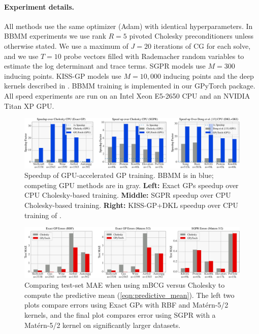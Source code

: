 \paragraph{Experiment details.} All methods use the same optimizer (Adam) with identical hyperparameters.
In BBMM experiments we use rank $R\!=\!5$ pivoted Cholesky preconditioners unless otherwise stated.
We use a maximum of $J\!=\!20$ iterations of CG for each solve, and
we use $T\!=\!10$ probe vectors filled with Rademacher random variables to estimate the log determinant and trace terms.
SGPR models use $M\!=\!300$ inducing points.
KISS-GP models use $M\!=\!10,\!000$ inducing points and the deep kernels described in \cite{wilson2016deep}.
BBMM training is implemented in our GPyTorch package.
All speed experiments are run on an Intel Xeon E5-2650 CPU and an NVIDIA Titan XP GPU.

\begin{figure}[t]
  \centering
  \includegraphics[width=\textwidth]{figures/sparse_gp_results}
  \caption[Speedup of GPU-accelerated GP training.]{
    Speedup of GPU-accelerated GP training.
    BBMM is in blue; competing GPU methods are in gray.
    {\bf Left:} Exact GPs speedup over CPU Cholesky-based training.
    {\bf Middle:} SGPR \cite{titsias2009variational,hensman2013gaussian} speedup over CPU Cholesky-based training.
    {\bf Right:} KISS-GP+DKL \cite{wilson2015kernel,wilson2016deep} speedup over CPU training of \citet{dong2017scalable}.
    \label{fig:timing_results}
  }
\end{figure}
%
\begin{figure}[t]
  \centering
  \includegraphics[width=\textwidth]{figures/exact_gp_chol_vs_mvm}
  \caption[Comparing test-set MAE when using mBCG versus Cholesky to compute the predictive mean.]{
		Comparing test-set MAE when using mBCG versus Cholesky to compute the predictive mean (\cref{eqn:predictive_mean}).
		The left two plots compare errors using Exact GPs with RBF and Mat\'ern-5/2 kernels,
		and the final plot compares error using SGPR with a Mat\'ern-5/2 kernel on significantly larger datasets.
	}
  \label{fig:bbmm_error_results}
\end{figure}


